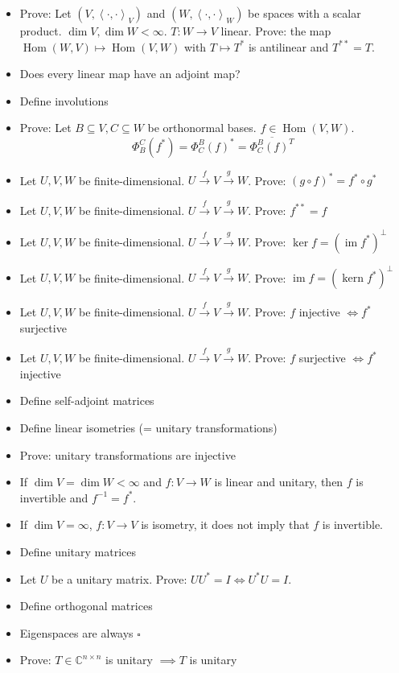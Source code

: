 \documentclass[a4paper]{article}
\newcommand{\ip}[2]{\left\langle#1,#2\right\rangle} %
\DeclareMathOperator{\im}{im}
\DeclareMathOperator{\ke}{kern}
\begin{document}
\begin{itemize}
  \item Prove: Let $(V, \ip{\cdot}{\cdot}_V)$ and $(W, \ip{\cdot}{\cdot}_W)$ be spaces with a scalar product. $\dim{V}, \dim{W} < \infty$.
    $T: W \to V$ linear. Prove: the map $\operatorname{Hom}(W, V) \mapsto \operatorname{Hom}(V, W)$ with $T \mapsto T^*$ is antilinear and $T^{**} = T$.
  \item Does every linear map have an adjoint map?
  \item Define involutions
  \item Prove: Let $B \subseteq V, C \subseteq W$ be orthonormal bases. $f \in \operatorname{Hom}(V, W)$.
    \[ \Phi_B^C(f^*) = \Phi_C^B(f)^* = \overline{\Phi_C^B(f)^T} \]
  \item Let $U, V, W$ be finite-dimensional. $U \xrightarrow f V \xrightarrow g W$. Prove: $(g \circ f)^* = f^* \circ g^*$
  \item Let $U, V, W$ be finite-dimensional. $U \xrightarrow f V \xrightarrow g W$. Prove: $f^{**} = f$
  \item Let $U, V, W$ be finite-dimensional. $U \xrightarrow f V \xrightarrow g W$. Prove: $\ker{f} = (\im{f^*})^\bot$
  \item Let $U, V, W$ be finite-dimensional. $U \xrightarrow f V \xrightarrow g W$. Prove: $\im{f} = (\ke{f^*})^\bot$
  \item Let $U, V, W$ be finite-dimensional. $U \xrightarrow f V \xrightarrow g W$. Prove: $f$ injective $\iff f^*$ surjective
  \item Let $U, V, W$ be finite-dimensional. $U \xrightarrow f V \xrightarrow g W$. Prove: $f$ surjective $\iff f^*$ injective
  \item Define self-adjoint matrices
  \item Define linear isometries (= unitary transformations)
  \item Prove: unitary transformations are injective
  \item If $\dim{V} = \dim{W} < \infty$ and $f: V \to W$ is linear and unitary, then $f$ is invertible and $f^{-1} = f^*$.
  \item If $\dim{V} = \infty$, $f: V \to V$ is isometry, it does not imply that $f$ is invertible.
  \item Define unitary matrices
  \item Let $U$ be a unitary matrix. Prove: $UU^* = I \iff U^* U = I$.
  \item Define orthogonal matrices
  \item Eigenspaces are always $\square{}$
  \item Prove: $T \in \mathbb C^{n \times n}$ is unitary $\implies T$ is unitary

\end{itemize}
\end{document}
